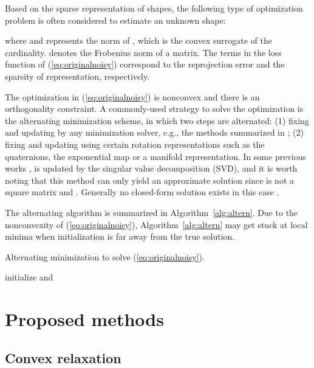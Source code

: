 \documentclass[10pt,journal,cspaper,compsoc]{IEEEtran}
\newcommand{\refEq}[1]{(\ref{#1})}
\newcommand{\refAlg}[1]{Algorithm~\ref{#1}}
\begin{document}
Based on the sparse representation of shapes, the following type of optimization problem is often considered to estimate an unknown shape:

where  and  represents the  norm of , which is the convex surrogate of the cardinality.  denotes the Frobenius norm of a matrix. The terms in the loss function of \refEq{eq:originalnoisy} correspond to the reprojection error and the sparsity of representation, respectively.

The optimization in \refEq{eq:originalnoisy} is nonconvex and there is an orthogonality constraint. A commonly-used strategy to solve the optimization is the alternating minimization scheme, in which two steps are alternated: (1) fixing  and updating  by any  minimization solver, e.g., the methods summarized in \cite{bach2012optimization}; (2) fixing  and updating  using certain rotation representations such as the quaternions, the exponential map or a manifold representation. In some previous works \cite{ramakrishna2012reconstructing,akhter2015pose},  is updated by the singular value decomposition (SVD), and it is worth noting that this method can only yield an approximate solution since  is not a square matrix and . Generally no closed-form solution exists in this case \cite{edelman1998geometry}.

The alternating algorithm is summarized in \refAlg{alg:altern}. Due to the nonconvexity of \refEq{eq:originalnoisy}, \refAlg{alg:altern} may get stuck at local minima when initialization is far away from the true solution.

\begin{algorithm}\label{alg:altern}
\LinesNumbered
\caption{Alternating minimization to solve \refEq{eq:originalnoisy}.}
\KwIn{}
\vspace{0.5em}
initialize  and \;
\vspace{0.5em}
\end{algorithm}


\section{Proposed methods}\label{sec:methods}

\subsection{Convex relaxation}\label{sec:relaxation}
\end{document}
